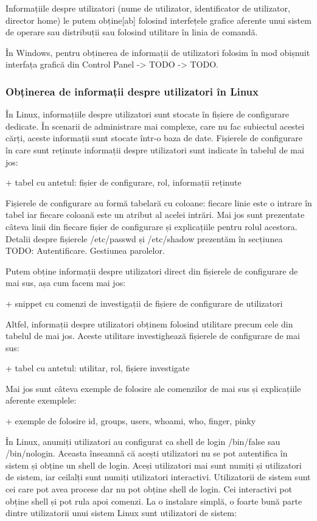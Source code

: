 Informațiile despre utilizatori (nume de utilizator, identificator de
utilizator, director home) le putem obține[ab] folosind interfețele grafice
aferente unui sistem de operare sau distribuții sau folosind utilitare în linia
de comandă.

În Windows, pentru obținerea de informații de utilizatori folosim în mod
obișnuit interfața grafică din Control Panel -> TODO -> TODO.

\subsubsection{Obținerea de informații despre utilizatori în Linux}
\label{sec:users-ops-info-linux}

În Linux, informațiile despre utilizatori sunt stocate în fișiere de configurare
dedicate. În scenarii de administrare mai complexe, care nu fac subiectul
acestei cărți, aceste informații sunt stocate într-o baza de date. Fișierele de
configurare în care sunt reținute informații despre utilizatori sunt indicate în
tabelul de mai jos:

+ tabel cu antetul: fișier de configurare, rol, informații reținute

Fișierele de configurare au formă tabelară cu coloane: fiecare linie este o
intrare în tabel iar fiecare coloană este un atribut al acelei intrări. Mai jos
sunt prezentate câteva linii din fiecare fișier de configurare și explicațiile
pentru rolul acestora. Detalii despre fișierele /etc/passwd și /etc/shadow
prezentăm în secțiunea TODO: Autentificare. Gestiunea parolelor.

Putem obține informații despre utilizatori direct din fișierele de configurare
de mai sus, așa cum facem mai jos:

+ snippet cu comenzi de investigații de fișiere de configurare de utilizatori

Altfel, informații despre utilizatori obținem folosind utilitare precum cele din
tabelul de mai jos. Aceste utilitare investighează fișierele de configurare de
mai sus:

+ tabel cu antetul: utilitar, rol, fișiere investigate

Mai jos sunt câteva exemple de folosire ale comenzilor de mai sus și
explicațiile aferente exemplele:

+ exemple de folosire id, groups, users, whoami, who, finger, pinky

În Linux, anumiți utilizatori au configurat ca shell de login /bin/false sau
/bin/nologin. Aceasta înseamnă că acești utilizatori nu se pot autentifica în
sistem și obține un shell de login. Aceși utilizatori mai sunt numiți și
utilizatori de sistem, iar ceilalți sunt numiți utilizatori interactivi.
Utilizatorii de sistem sunt cei care pot avea procese dar nu pot obține shell de
login. Cei interactivi pot obține shell și pot rula apoi comenzi. La o instalare
simplă, o foarte bună parte dintre utilizatorii unui sistem Linux sunt
utilizatori de sistem:

